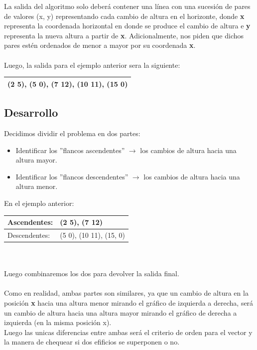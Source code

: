 La salida del algoritmo solo deber\'a contener una l\'inea con una sucesi\'on de pares de valores (x, y) representando cada cambio de altura en el horizonte, donde \textbf{x} representa la coordenada horizontal en donde se produce el cambio de altura e \textbf{y} representa la nueva altura a partir de \textbf{x}. Adicionalmente, nos piden que dichos pares est\'en ordenados de menor a mayor por su coordenada \textbf{x}.
\\
\\
Luego, la salida para el ejemplo anterior sera la siguiente:
\quad 
\begin{tabular}{| l |}
\hline
(2 5), (5 0), (7 12), (10 11), (15 0) \\ \hline
\end{tabular}



\subsection{Desarrollo}

Decidimos dividir el problema en dos partes: 
\begin{itemize}
\item Identificar los ''flancos ascendentes'' $\rightarrow$ los cambios de altura hacia una altura mayor.
\item Identificar los ''flancos descendentes'' $\rightarrow$ los cambios de altura hacia una altura menor.
\end{itemize}
En el ejemplo anterior: \quad \quad
\begin{tabular}{| l | l |}
\hline
Ascendentes:   & (2 5), (7 12) \\ \hline
Descendentes:  & (5 0), (10 11), (15, 0) \\ \hline
\end{tabular}
\\
\\
Luego combinaremos los dos para devolver la salida final.
\\
\\
Como en realidad, ambas partes son similares, ya que un cambio de altura en la posici\'on \textbf{x} hacia una altura menor mirando el gr\'afico de izquierda a derecha, ser\'a un cambio de altura hacia una altura mayor mirando el gr\'afico de derecha a izquierda (en la misma posici\'on x). \\
Luego las unicas diferencias entre ambas ser\'a el criterio de orden para el vector y la manera de chequear si dos efificios se superponen o no.


